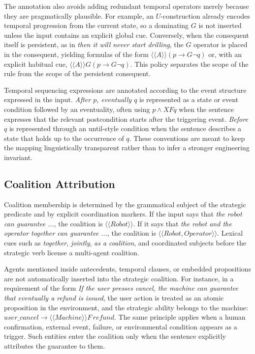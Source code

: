 \documentclass[letterpaper]{article}
\newcommand{\atl}[1]{\ensuremath{\langle\!\langle #1 \rangle\!\rangle}}
\begin{document}
The annotation also avoids adding redundant temporal operators merely because they are pragmatically plausible. For example, an $U$-construction already encodes temporal progression from the current state, so a dominating $G$ is not inserted unless the input contains an explicit global cue. Conversely, when the consequent itself is persistent, as in \emph{then it will never start drilling}, the $G$ operator is placed in the consequent, yielding formulas of the form $\atl{A}(p \rightarrow G\neg q)$ or, with an explicit habitual cue, $\atl{A}G(p \rightarrow G\neg q)$. This policy separates the scope of the rule from the scope of the persistent consequent.

Temporal sequencing expressions are annotated according to the event structure expressed in the input. \emph{After $p$, eventually $q$} is represented as a state or event condition followed by an eventuality, often using $p \wedge X F q$ when the sentence expresses that the relevant postcondition starts after the triggering event. \emph{Before $q$} is represented through an until-style condition when the sentence describes a state that holds up to the occurrence of $q$. These conventions are meant to keep the mapping linguistically transparent rather than to infer a stronger engineering invariant.

\subsection{Coalition Attribution}

Coalition membership is determined by the grammatical subject of the strategic predicate and by explicit coordination markers. If the input says that \emph{the robot can guarantee ...}, the coalition is $\atl{Robot}$. If it says that \emph{the robot and the operator together can guarantee ...}, the coalition is $\atl{Robot,Operator}$. Lexical cues such as \emph{together}, \emph{jointly}, \emph{as a coalition}, and coordinated subjects before the strategic verb license a multi-agent coalition.

Agents mentioned inside antecedents, temporal clauses, or embedded propositions are not automatically inserted into the strategic coalition. For instance, in a requirement of the form \emph{If the user presses cancel, the machine can guarantee that eventually a refund is issued}, the user action is treated as an atomic proposition in the environment, and the strategic ability belongs to the machine: $user\_cancel \rightarrow \atl{Machine}F\,refund$. The same principle applies when a human confirmation, external event, failure, or environmental condition appears as a trigger. Such entities enter the coalition only when the sentence explicitly attributes the guarantee to them.
\end{document}
